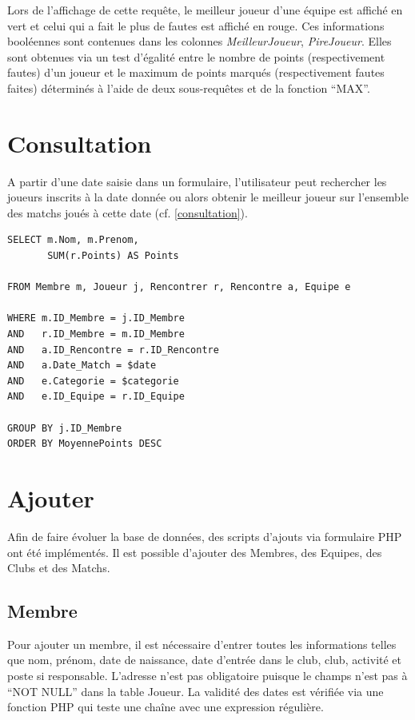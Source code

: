 \documentclass[a4paper,8pt,french,fleqn]{report}
\begin{document}
Lors de l'affichage de cette requête, le meilleur joueur d'une équipe est affiché en vert et celui qui a fait le plus de fautes est affiché en rouge. Ces informations booléennes sont contenues dans les colonnes \textit{MeilleurJoueur}, \textit{PireJoueur}. Elles sont obtenues via un test d'égalité entre le nombre de points (respectivement fautes) d'un joueur et le maximum de points marqués (respectivement fautes faites) déterminés à l'aide de deux sous-requêtes et de la fonction ``MAX''.


\section{Consultation}
A partir d'une date saisie dans un formulaire, l'utilisateur peut rechercher les joueurs inscrits à la date donnée ou alors obtenir le meilleur joueur sur l'ensemble des matchs joués à cette date (cf. \ref{consultation}).

\begin{lstlisting}
SELECT m.Nom, m.Prenom,
       SUM(r.Points) AS Points
				
FROM Membre m, Joueur j, Rencontrer r, Rencontre a, Equipe e

WHERE m.ID_Membre = j.ID_Membre
AND   r.ID_Membre = m.ID_Membre
AND   a.ID_Rencontre = r.ID_Rencontre
AND   a.Date_Match = $date
AND   e.Categorie = $categorie
AND   e.ID_Equipe = r.ID_Equipe

GROUP BY j.ID_Membre
ORDER BY MoyennePoints DESC
\end{lstlisting}

\section{Ajouter}

Afin de faire évoluer la base de données, des scripts d'ajouts via formulaire PHP ont été implémentés. Il est possible d'ajouter des Membres, des Equipes, des Clubs et des Matchs.

\subsection{Membre}
Pour ajouter un membre, il est nécessaire d'entrer toutes les informations telles que nom, prénom, date de naissance, date d'entrée dans le club, club, activité et poste si responsable. L'adresse n'est pas obligatoire puisque le champs n'est pas à ``NOT NULL'' dans la table Joueur. La validité des dates est vérifiée via une fonction PHP qui teste une chaîne avec une expression régulière. \\
\end{document}
